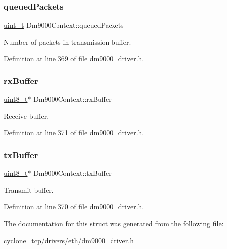 \subsubsection{\texorpdfstring{queued\+Packets}{queuedPackets}}
{\footnotesize\ttfamily \hyperlink{compiler__port_8h_a12a1e9b3ce141648783a82445d02b58d}{uint\+\_\+t} Dm9000\+Context\+::queued\+Packets}



Number of packets in transmission buffer. 



Definition at line 369 of file dm9000\+\_\+driver.\+h.

\mbox{\label{structDm9000Context_accdec387715282c04559710494cd0066}} 
\subsubsection{\texorpdfstring{rx\+Buffer}{rxBuffer}}
{\footnotesize\ttfamily \hyperlink{stdint_8h_aba7bc1797add20fe3efdf37ced1182c5}{uint8\+\_\+t}$\ast$ Dm9000\+Context\+::rx\+Buffer}



Receive buffer. 



Definition at line 371 of file dm9000\+\_\+driver.\+h.

\mbox{\label{structDm9000Context_a72e4ef12dece5a9596fbadb0bcc22418}} 
\subsubsection{\texorpdfstring{tx\+Buffer}{txBuffer}}
{\footnotesize\ttfamily \hyperlink{stdint_8h_aba7bc1797add20fe3efdf37ced1182c5}{uint8\+\_\+t}$\ast$ Dm9000\+Context\+::tx\+Buffer}



Transmit buffer. 



Definition at line 370 of file dm9000\+\_\+driver.\+h.



The documentation for this struct was generated from the following file\+:\begin{DoxyCompactItemize}
\item 
cyclone\+\_\+tcp/drivers/eth/\hyperlink{dm9000__driver_8h}{dm9000\+\_\+driver.\+h}\end{DoxyCompactItemize}
